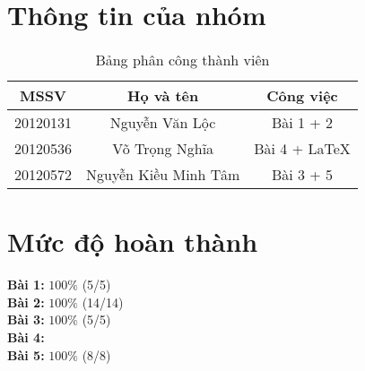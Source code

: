 \section{Thông tin của nhóm}
\begin{table}[H]
\begin{center}
\begin{tabular}{|c|c|c|}
\hline 
MSSV & Họ và tên & Công việc \\ 
\hline 
20120131 & Nguyễn Văn Lộc & Bài 1 + 2 \\ 
\hline 
20120536 & Võ Trọng Nghĩa & Bài 4 + \LaTeX \\ 
\hline 
20120572 & Nguyễn Kiều Minh Tâm & Bài 3 + 5 \\ 
\hline 
\end{tabular}
\caption{Bảng phân công thành viên} 
\end{center}
\end{table}

\section{Mức độ hoàn thành}
\textbf{Bài 1:} $100\%$ (5/5)\\
\textbf{Bài 2:} $100\%$ (14/14)\\
\textbf{Bài 3:} $100\%$ (5/5)\\
\textbf{Bài 4:} \\
\textbf{Bài 5:} $100\%$ (8/8)\\